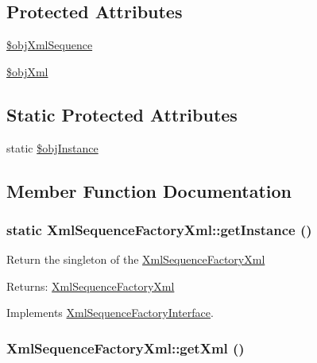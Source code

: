 \subsection*{Protected Attributes}
\begin{CompactItemize}
\item 
\hyperlink{class_xml_sequence_factory_xml_1d865d45fe3869ce6fa4e04fb6abb67f}{\$objXmlSequence}
\item 
\hyperlink{class_xml_sequence_factory_xml_f3fc8098a87d7549b61c2a8a39fdf38e}{\$objXml}
\end{CompactItemize}
\subsection*{Static Protected Attributes}
\begin{CompactItemize}
\item 
static \hyperlink{class_xml_sequence_factory_xml_9ca8b6656cdaf015c7016825782b81b1}{\$objInstance}
\end{CompactItemize}


\subsection{Member Function Documentation}
\hypertarget{class_xml_sequence_factory_xml_04cfad5bd111c3dd8f264e783ed91328}{
\subsubsection[{getInstance}]{\setlength{\rightskip}{0pt plus 5cm}static XmlSequenceFactoryXml::getInstance ()}}
\label{class_xml_sequence_factory_xml_04cfad5bd111c3dd8f264e783ed91328}


Return the singleton of the \hyperlink{class_xml_sequence_factory_xml}{XmlSequenceFactoryXml}

\begin{Desc}
\item[Returns:]\hyperlink{class_xml_sequence_factory_xml}{XmlSequenceFactoryXml} \end{Desc}


Implements \hyperlink{interface_xml_sequence_factory_interface_5ad765cdd7548f50459910554b46b015}{XmlSequenceFactoryInterface}.\hypertarget{class_xml_sequence_factory_xml_40c24f121f17fb47d4d5424db95a2f95}{
\subsubsection[{getXml}]{\setlength{\rightskip}{0pt plus 5cm}XmlSequenceFactoryXml::getXml ()}}
\label{class_xml_sequence_factory_xml_40c24f121f17fb47d4d5424db95a2f95}


